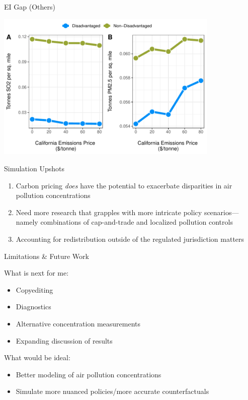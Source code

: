 \documentclass[11pt, aspectratio = 169]{beamer}
\newcommand{\1}{\mathds{1}}
\begin{document}
\begin{frame}{EI Gap (Others)}

\centering
\includegraphics[width = 0.8\textwidth]{figures/chapter5_figures/ei_gap_so2_pm25.pdf}

\end{frame}




\begin{frame}{Simulation Upshots}

\begin{enumerate}
    \item Carbon pricing \emph{does} have the potential to exacerbate disparities in air pollution concentrations 
    \vfill
    \item Need more research that grapples with more intricate policy scenarios---namely combinations of cap-and-trade and localized pollution controls
    \vfill 
    \item Accounting for redistribution outside of the regulated jurisdiction matters
\end{enumerate}
    
\end{frame}


\begin{frame}{Limitations \& Future Work}

What is next for me:
\begin{itemize}
    \item Copyediting
    \item Diagnostics
    \item Alternative concentration measurements
    \item Expanding discussion of results
\end{itemize}

\vfill
What would be ideal:
\begin{itemize}
    \item Better modeling of air pollution concentrations
    \item Simulate more nuanced policies/more accurate counterfactuals
\end{itemize}

\end{frame}
\end{document}
